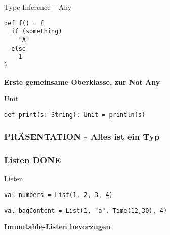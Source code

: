 \documentclass[14pt,aspectratio=169,trans]{beamer} %
\begin{document}
\begin{frame}[fragile]{}
 \begin{block}{Type Inference -- Any}
\scriptsize
	\onslide<2->
  \begin{lstlisting}
def f() = {
  if (something)
    "A"
  else
    1
}
	\end{lstlisting}
\end{block}
\textbf{Erste gemeinsame Oberklasse, zur Not Any}
\note{}
\end{frame}

\begin{frame}[fragile]{}
 \begin{block}{Unit}
\scriptsize
	\onslide<2->
  \begin{lstlisting}
def print(s: String): Unit = println(s)
	\end{lstlisting}
\end{block}
\end{frame}



\subsubsection*{PRÄSENTATION - Alles ist ein Typ}


\subsubsection*{Listen DONE}

\begin{frame}[fragile]{}
 \begin{block}{Listen}
\scriptsize
	\onslide<2->
  \begin{lstlisting}
val numbers = List(1, 2, 3, 4)

	\end{lstlisting}
  \begin{lstlisting}[firstnumber = 2]
val bagContent = List(1, "a", Time(12,30), 4)
	\end{lstlisting}
\end{block}
\textbf{Immutable-Listen bevorzugen}
\end{frame}
\end{document}

